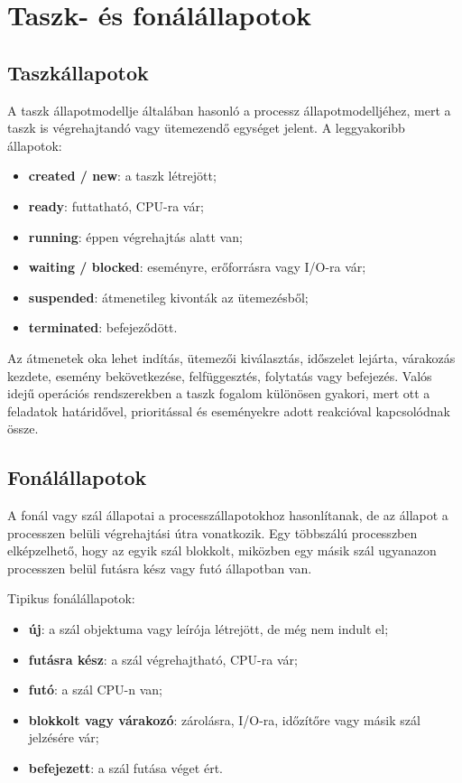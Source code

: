 \section{Taszk- és fonálállapotok}

\subsection{Taszkállapotok}

A taszk állapotmodellje általában hasonló a processz állapotmodelljéhez, mert a taszk is végrehajtandó vagy ütemezendő egységet jelent. A leggyakoribb állapotok:

\begin{itemize}
  \item \textbf{created / new}: a taszk létrejött;
  \item \textbf{ready}: futtatható, CPU-ra vár;
  \item \textbf{running}: éppen végrehajtás alatt van;
  \item \textbf{waiting / blocked}: eseményre, erőforrásra vagy I/O-ra vár;
  \item \textbf{suspended}: átmenetileg kivonták az ütemezésből;
  \item \textbf{terminated}: befejeződött.
\end{itemize}

Az átmenetek oka lehet indítás, ütemezői kiválasztás, időszelet lejárta, várakozás kezdete, esemény bekövetkezése, felfüggesztés, folytatás vagy befejezés. Valós idejű operációs rendszerekben a taszk fogalom különösen gyakori, mert ott a feladatok határidővel, prioritással és eseményekre adott reakcióval kapcsolódnak össze.

\subsection{Fonálállapotok}

A fonál vagy szál állapotai a processzállapotokhoz hasonlítanak, de az állapot a processzen belüli végrehajtási útra vonatkozik. Egy többszálú processzben elképzelhető, hogy az egyik szál blokkolt, miközben egy másik szál ugyanazon processzen belül futásra kész vagy futó állapotban van.

Tipikus fonálállapotok:

\begin{itemize}
  \item \textbf{új}: a szál objektuma vagy leírója létrejött, de még nem indult el;
  \item \textbf{futásra kész}: a szál végrehajtható, CPU-ra vár;
  \item \textbf{futó}: a szál CPU-n van;
  \item \textbf{blokkolt vagy várakozó}: zárolásra, I/O-ra, időzítőre vagy másik szál jelzésére vár;
  \item \textbf{befejezett}: a szál futása véget ért.
\end{itemize}

